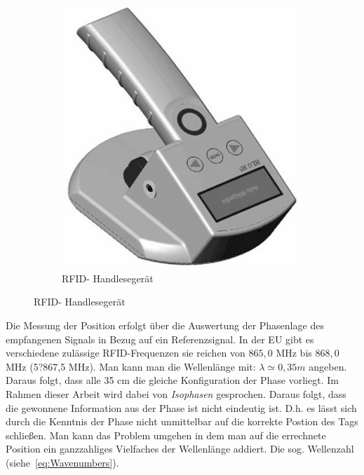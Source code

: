 \begin{figure} [h!]
%         
\qquad
%
         \begin{subfigure}[h]{0.4\textwidth}
                 \centering
                 \includegraphics[width=\textwidth]{img/RFID-Reader_gs.png}
                 \vspace{.1cm}
                 \caption{RFID- Handlesegerät }
                 \label{fig:READER}
         \end{subfigure}
\end{figure}
%
\label{sec:Measurement1}
%
%
Die Messung der Position erfolgt über die Auswertung der Phasenlage des empfangenen Signals in Bezug auf ein Referenzsignal. In der EU gibt es verschiedene zulässige RFID-Frequenzen sie reichen von $865,0$ MHz bis $868,0$ MHz\cite{etsi1} (5?867,5 MHz). Man kann man die Wellenlänge mit: $ \lambda\simeq0,35 m $ angeben. Daraus folgt, dass alle 35 cm die gleiche Konfiguration der Phase vorliegt. Im Rahmen dieser Arbeit wird dabei von \textit{Isophasen} gesprochen. Daraus folgt, dass die gewonnene Information aus der Phase ist nicht eindeutig ist. D.h. es lässt sich durch die Kenntnis der Phase nicht unmittelbar auf die korrekte Postion des Tags schließen. Man kann das Problem umgehen in dem man auf die errechnete Position ein ganzzahliges Vielfaches der Wellenlänge addiert. Die sog. Wellenzahl (siehe~\eqref{eq:Wavenumbers}).\\
